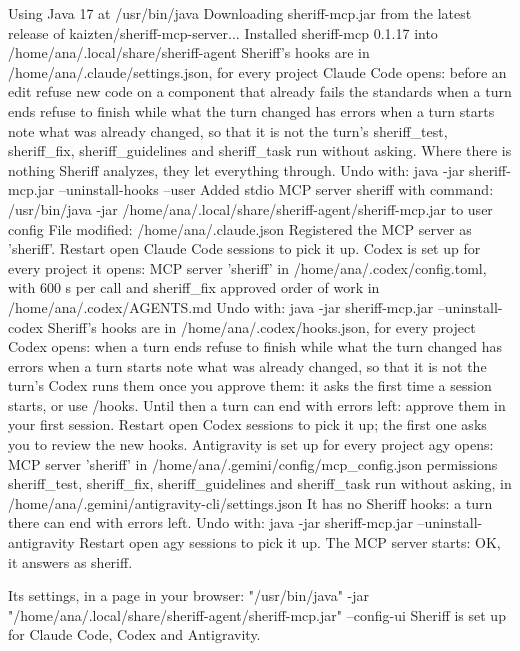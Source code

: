 \documentclass[11pt,a4paper]{article}
\begin{document}
\begin{answer}
Using Java 17 at /usr/bin/java
Downloading sheriff-mcp.jar from the latest release of kaizten/sheriff-mcp-server...
Installed sheriff-mcp 0.1.17 into /home/ana/.local/share/sheriff-agent
Sheriff's hooks are in /home/ana/.claude/settings.json, for every project Claude Code opens:
  before an edit     refuse new code on a component that already fails the standards
  when a turn ends   refuse to finish while what the turn changed has errors
  when a turn starts note what was already changed, so that it is not the turn's
sheriff_test, sheriff_fix, sheriff_guidelines and sheriff_task run without asking.
Where there is nothing Sheriff analyzes, they let everything through.
Undo with: java -jar sheriff-mcp.jar --uninstall-hooks --user
Added stdio MCP server sheriff with command: /usr/bin/java -jar /home/ana/.local/share/sheriff-agent/sheriff-mcp.jar to user config
File modified: /home/ana/.claude.json
Registered the MCP server as 'sheriff'. Restart open Claude Code sessions to pick it up.
Codex is set up for every project it opens:
  MCP server     'sheriff' in /home/ana/.codex/config.toml, with 600 s per call and sheriff_fix approved
  order of work  in /home/ana/.codex/AGENTS.md
Undo with: java -jar sheriff-mcp.jar --uninstall-codex
Sheriff's hooks are in /home/ana/.codex/hooks.json, for every project Codex opens:
  when a turn ends   refuse to finish while what the turn changed has errors
  when a turn starts note what was already changed, so that it is not the turn's
Codex runs them once you approve them: it asks the first time a session starts, or use /hooks.
Until then a turn can end with errors left: approve them in your first session.
Restart open Codex sessions to pick it up; the first one asks you to review the new hooks.
Antigravity is set up for every project agy opens:
  MCP server     'sheriff' in /home/ana/.gemini/config/mcp_config.json
  permissions    sheriff_test, sheriff_fix, sheriff_guidelines and sheriff_task run without asking,
                 in /home/ana/.gemini/antigravity-cli/settings.json
It has no Sheriff hooks: a turn there can end with errors left.
Undo with: java -jar sheriff-mcp.jar --uninstall-antigravity
Restart open agy sessions to pick it up.
The MCP server starts: OK, it answers as sheriff.

Its settings, in a page in your browser: "/usr/bin/java" -jar "/home/ana/.local/share/sheriff-agent/sheriff-mcp.jar" --config-ui
Sheriff is set up for Claude Code, Codex and Antigravity.
\end{answer}
\end{document}

